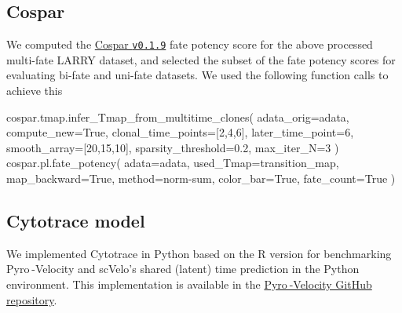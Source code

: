 \documentclass[
  sn-mathphys-num,
  lineno,
  twocolumn]{sn-jnl}
\newenvironment{Shaded}{\begin{snugshade}}{\end{snugshade}}
\newcommand{\DecValTok}[1]{\textcolor[rgb]{0.68,0.00,0.00}{#1}}
\newcommand{\FloatTok}[1]{\textcolor[rgb]{0.68,0.00,0.00}{#1}}
\newcommand{\NormalTok}[1]{\textcolor[rgb]{0.00,0.23,0.31}{#1}}
\newcommand{\OperatorTok}[1]{\textcolor[rgb]{0.37,0.37,0.37}{#1}}
\newcommand{\StringTok}[1]{\textcolor[rgb]{0.13,0.47,0.30}{#1}}
\newcommand{\VariableTok}[1]{\textcolor[rgb]{0.07,0.07,0.07}{#1}}
\begin{document}
\subsection{Cospar}\label{sec-methods-cospar}

We computed the
\href{https://github.com/AllonKleinLab/cospar/releases/tag/v0.1.9}{Cospar
\texttt{v0.1.9}} \citep{Wang2022-xb} fate potency score for the above
processed multi-fate LARRY dataset, and selected the subset of the fate
potency scores for evaluating bi-fate and uni-fate datasets. We used the
following function calls to achieve this

\begin{Shaded}
\begin{Highlighting}[]
\NormalTok{cospar.tmap.infer\_Tmap\_from\_multitime\_clones(}
\NormalTok{  adata\_orig}\OperatorTok{=}\NormalTok{adata, }
\NormalTok{  compute\_new}\OperatorTok{=}\VariableTok{True}\NormalTok{,}
\NormalTok{  clonal\_time\_points}\OperatorTok{=}\NormalTok{[}\DecValTok{2}\NormalTok{,}\DecValTok{4}\NormalTok{,}\DecValTok{6}\NormalTok{], }
\NormalTok{  later\_time\_point}\OperatorTok{=}\DecValTok{6}\NormalTok{,}
\NormalTok{  smooth\_array}\OperatorTok{=}\NormalTok{[}\DecValTok{20}\NormalTok{,}\DecValTok{15}\NormalTok{,}\DecValTok{10}\NormalTok{],}
\NormalTok{  sparsity\_threshold}\OperatorTok{=}\FloatTok{0.2}\NormalTok{, }
\NormalTok{  max\_iter\_N}\OperatorTok{=}\DecValTok{3}
\NormalTok{)}
\NormalTok{cospar.pl.fate\_potency(}
\NormalTok{  adata}\OperatorTok{=}\NormalTok{adata, }
\NormalTok{  used\_Tmap}\OperatorTok{=}\StringTok{\textquotesingle{}transition\_map\textquotesingle{}}\NormalTok{,}
\NormalTok{  map\_backward}\OperatorTok{=}\VariableTok{True}\NormalTok{,}
\NormalTok{  method}\OperatorTok{=}\StringTok{\textquotesingle{}norm{-}sum\textquotesingle{}}\NormalTok{,}
\NormalTok{  color\_bar}\OperatorTok{=}\VariableTok{True}\NormalTok{,}
\NormalTok{  fate\_count}\OperatorTok{=}\VariableTok{True}
\NormalTok{)}
\end{Highlighting}
\end{Shaded}

\subsection{Cytotrace model}\label{sec-methods-cytotrace}

We implemented Cytotrace in Python based on the R version
\citep{Gulati2020-xq} for benchmarking Pyro -Velocity and scVelo's
shared (latent) time prediction in the Python environment. This
implementation is available in the
\href{https://github.com/pinellolab/pyrovelocity/blob/main/src/pyrovelocity/analysis/cytotrace.py}{Pyro -Velocity
GitHub repository}.
\end{document}
